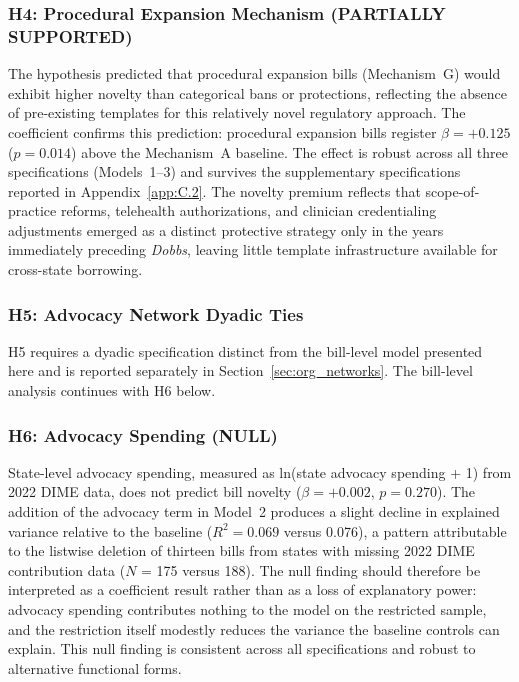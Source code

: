 \subsubsection{H4: Procedural Expansion Mechanism (PARTIALLY SUPPORTED)}
The hypothesis predicted that procedural expansion bills (Mechanism~G) would exhibit higher novelty than categorical bans or protections, reflecting the absence of pre-existing templates for this relatively novel regulatory approach. The coefficient confirms this prediction: procedural expansion bills register $\beta = +0.125$ ($p = 0.014$) above the Mechanism~A baseline. The effect is robust across all three specifications (Models~1--3) and survives the supplementary specifications reported in Appendix~\ref{app:C.2}. The novelty premium reflects that scope-of-practice reforms, telehealth authorizations, and clinician credentialing adjustments emerged as a distinct protective strategy only in the years immediately preceding \textit{Dobbs}, leaving little template infrastructure available for cross-state borrowing.

\subsubsection{H5: Advocacy Network Dyadic Ties}
H5 requires a dyadic specification distinct from the bill-level model presented here and is reported separately in Section~\ref{sec:org_networks}. The bill-level analysis continues with H6 below.

\subsubsection{H6: Advocacy Spending (NULL)}
State-level advocacy spending, measured as ln(state advocacy spending + 1) from 2022 DIME data, does not predict bill novelty ($\beta = +0.002$, $p = 0.270$). The addition of the advocacy term in Model~2 produces a slight decline in explained variance relative to the baseline ($R^2 = 0.069$ versus 0.076), a pattern attributable to the listwise deletion of thirteen bills from states with missing 2022 DIME contribution data ($N$ = 175 versus 188). The null finding should therefore be interpreted as a coefficient result rather than as a loss of explanatory power: advocacy spending contributes nothing to the model on the restricted sample, and the restriction itself modestly reduces the variance the baseline controls can explain. This null finding is consistent across all specifications and robust to alternative functional forms.

